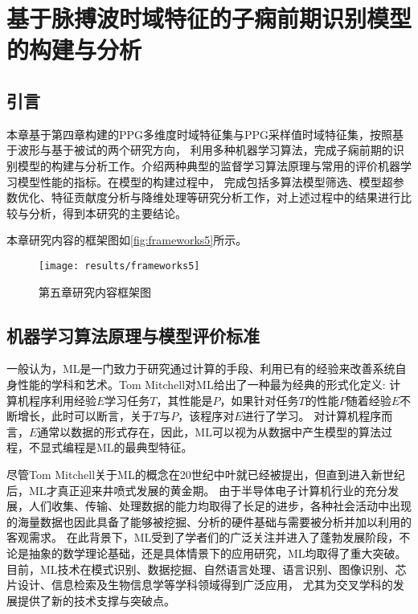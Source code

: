 \chapter{基于脉搏波时域特征的子痫前期识别模型的构建与分析}
\section{引言}
本章基于第四章构建的PPG多维度时域特征集与PPG采样值时域特征集，按照基于波形与基于被试的两个研究方向，
利用多种机器学习算法，完成子痫前期的识别模型的构建与分析工作。介绍两种典型的监督学习算法原理与常用的评价机器学习模型性能的指标。在模型的构建过程中，
完成包括多算法模型筛选、模型超参数优化、特征贡献度分析与降维处理等研究分析工作，对上述过程中的结果进行比较与分析，得到本研究的主要结论。

本章研究内容的框架图如\autoref{fig:frameworks5}所示。

\begin{figure}[htbp]
    \centering
    \texttt{[image: results/frameworks5]}
    \caption{\label{fig:frameworks5}第五章研究内容框架图}
\end{figure}
\vspace{-0.8cm} 

\section{机器学习算法原理与模型评价标准}
一般认为，ML是一门致力于研究通过计算的手段、利用已有的经验来改善系统自身性能的学科和艺术\cite{Zhou2016,Aurélien2018}。Tom Mitchell对ML给出了一种最为经典的形式化定义:
计算机程序利用经验$E$学习任务$T$，其性能是$P$，如果针对任务$T$的性能$P$随着经验$E$不断增长，此时可以断言，关于$T$与$P$，该程序对$E$进行了学习\cite{mitchell1997,Zhou2016}。
对计算机程序而言，$E$通常以数据的形式存在，因此，ML可以视为从数据中产生模型的算法过程，不显式编程是ML的最典型特征。

尽管Tom Mitchell关于ML的概念在20世纪中叶就已经被提出，但直到进入新世纪后，ML才真正迎来井喷式发展的黄金期。
由于半导体电子计算机行业的充分发展，人们收集、传输、处理数据的能力均取得了长足的进步，各种社会活动中出现的海量数据也因此具备了能够被挖掘、分析的硬件基础与需要被分析并加以利用的客观需求。
在此背景下，ML受到了学者们的广泛关注并进入了蓬勃发展阶段，不论是抽象的数学理论基础，还是具体情景下的应用研究，ML均取得了重大突破。
目前，ML技术在模式识别、数据挖掘、自然语言处理、语言识别、图像识别、芯片设计、信息检索及生物信息学等学科领域得到广泛应用，
尤其为交叉学科的发展提供了新的技术支撑与突破点\cite{Zhou2016,Aurélien2018,Li2017}。   

